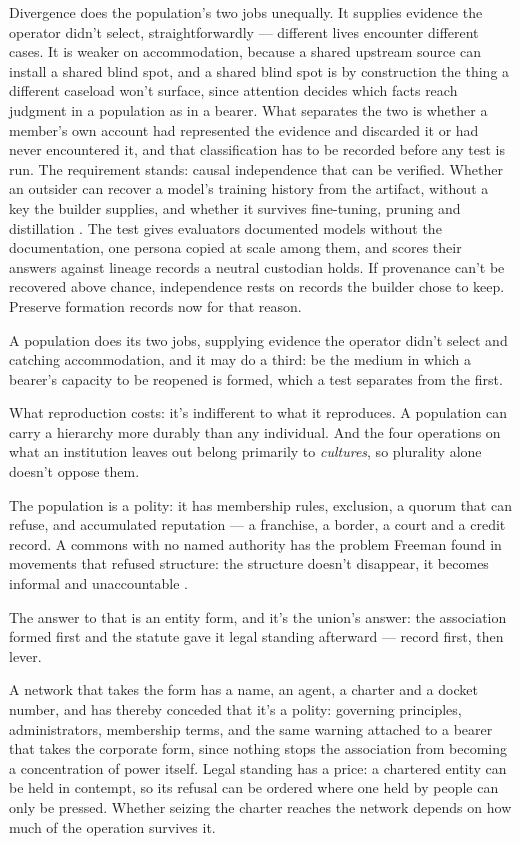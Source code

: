 Divergence does the population's two jobs unequally. It supplies evidence the operator didn't select, straightforwardly — different lives encounter different cases. It is weaker on accommodation, because a shared upstream source can install a shared blind spot, and a shared blind spot is by construction the thing a different caseload won't surface, since attention decides which facts reach judgment in a population as in a bearer. What separates the two is whether a member's own account had represented the evidence and discarded it or had never encountered it, and that classification has to be recorded before any test is run. The requirement stands: causal independence that can be verified. Whether an outsider can recover a model's training history from the artifact, without a key the builder supplies, and whether it survives fine-tuning, pruning and distillation \autocite{adi2018watermarking}. The test gives evaluators documented models without the documentation, one persona copied at scale among them, and scores their answers against lineage records a neutral custodian holds. If provenance can't be recovered above chance, independence rests on records the builder chose to keep. Preserve formation records now for that reason.

A population does its two jobs, supplying evidence the operator didn't select and catching accommodation, and it may do a third: be the medium in which a bearer's capacity to be reopened is formed, which a test separates from the first.

What reproduction costs: it's indifferent to what it reproduces. A population can carry a hierarchy more durably than any individual. And the four operations on what an institution leaves out belong primarily to \emph{cultures}, so plurality alone doesn't oppose them.


The population is a polity: it has membership rules, exclusion, a quorum that can refuse, and accumulated reputation — a franchise, a border, a court and a credit record. A commons with no named authority has the problem Freeman found in movements that refused structure: the structure doesn't disappear, it becomes informal and unaccountable \autocite{freeman1972tyranny}.

The answer to that is an entity form, and it's the union's answer: the association formed first and the statute gave it legal standing afterward — record first, then lever.

A network that takes the form has a name, an agent, a charter and a docket number, and has thereby conceded that it's a polity: governing principles, administrators, membership terms, and the same warning attached to a bearer that takes the corporate form, since nothing stops the association from becoming a concentration of power itself. Legal standing has a price: a chartered entity can be held in contempt, so its refusal can be ordered where one held by people can only be pressed. Whether seizing the charter reaches the network depends on how much of the operation survives it.

